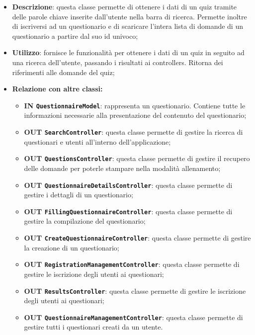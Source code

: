 \begin{itemize}
	\item \textbf{Descrizione}: questa classe permette di ottenere i dati di un quiz tramite delle parole chiave inserite dall'utente nella barra di ricerca. Permette inoltre di iscriversi ad un questionario e di scaricare l'intera lista di domande di un questionario a partire dal suo id univoco;
	\item \textbf{Utilizzo}: fornisce le funzionalità per ottenere i dati di un quiz in seguito ad una ricerca dell'utente, passando i risultati ai controllers. Ritorna dei riferimenti alle domande del quiz;
	\item \textbf{Relazione con altre classi:}
	\begin{itemize}
		\item \textbf{IN \texttt{QuestionnaireModel}}: rappresenta un questionario. Contiene tutte le informazioni necessarie alla
		presentazione del contenuto del questionario; 
		\item \textbf{OUT \texttt{SearchController}}: questa classe permette di gestire la ricerca di questionari e utenti all'interno dell'applicazione;
		\item \textbf{OUT \texttt{QuestionsController}}: questa classe permette di gestire il recupero delle domande per poterle stampare nella modalità allenamento;
		\item \textbf{OUT \texttt{QuestionnaireDetailsController}}: questa classe permette di gestire i dettagli di un questionario;
		\item \textbf{OUT \texttt{FillingQuestionnaireController}}: questa classe permette di gestire la compilazione del questionario;
		\item \textbf{OUT \texttt{CreateQuestionnaireController}}: questa classe permette di gestire la creazione di un questionario;
		\item \textbf{OUT \texttt{RegistrationManagementController}}: questa classe permette di gestire le iscrizione degli utenti ai questionari;
		\item \textbf{OUT \texttt{ResultsController}}: questa classe permette di gestire le iscrizione degli utenti ai questionari; 
		\item \textbf{OUT \texttt{QuestionnaireManagementController}}: questa classe permette di gestire tutti i questionari creati da un utente. 
		

\end{itemize}
\end{itemize}
